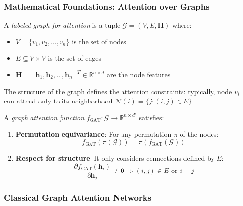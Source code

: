 \subsubsection{Mathematical Foundations: Attention over Graphs}\label{subsubsec:fundamentos_atencion_grafos}

\begin{definition}\label{def:labeled_graph_attention}
A \textit{labeled graph for attention} is a tuple $\mathcal{G} = (V, E, \mathbf{H})$ where:
\begin{itemize}
    \item $V = \{v_1, v_2, \ldots, v_n\}$ is the set of nodes
    \item $E \subseteq V \times V$ is the set of edges
    \item $\mathbf{H} = [\mathbf{h}_1, \mathbf{h}_2, \ldots, \mathbf{h}_n]^T \in \mathbb{R}^{n \times d}$ are the node features
\end{itemize}
The structure of the graph defines the attention constraints: typically, node $v_i$ can attend only to its neighborhood $\mathcal{N}(i) = \{j : (i,j) \in E\}$.
\end{definition}

\begin{definition}\label{def:graph_attention_function}
A \textit{graph attention function} $f_{\text{GAT}}: \mathcal{G} \to \mathbb{R}^{n \times d'}$ satisfies:
\begin{enumerate}
    \item \textbf{Permutation equivariance}: For any permutation $\pi$ of the nodes:
    \begin{equation}
        f_{\text{GAT}}(\pi(\mathcal{G})) = \pi(f_{\text{GAT}}(\mathcal{G}))
        \label{eq:gat_permutation_equivariance}
    \end{equation}

    \item \textbf{Respect for structure}: It only considers connections defined by $E$:
    \begin{equation}
        \frac{\partial f_{\text{GAT}}(\mathbf{h}_i)}{\partial \mathbf{h}_j} \neq \mathbf{0} \Rightarrow (i,j) \in E \text{ or } i = j
        \label{eq:gat_structural_constraint}
    \end{equation}
\end{enumerate}
\end{definition}

\subsubsection{Classical Graph Attention Networks}\label{subsubsec:gat_clasicos}

